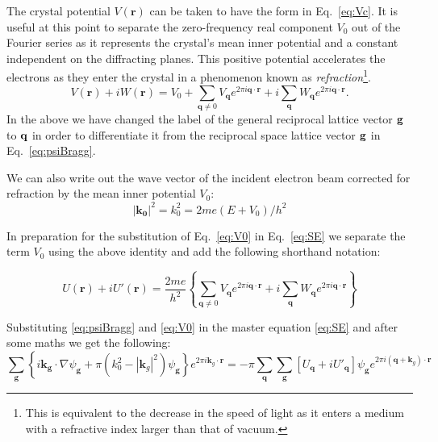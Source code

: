The crystal potential $V(\mathbf{r})$ can be taken to have the form in Eq.~\ref{eq:Vc}. It is useful at this point to separate the zero-frequency real component $V_0$ out of the Fourier series as it represents the crystal's mean inner potential and a constant independent on the diffracting planes. This positive potential accelerates the electrons as they enter the crystal in a phenomenon known as \textit{refraction}\footnote{ This is equivalent to the decrease in the speed of light as it enters a medium with a refractive index larger than that of vacuum.}.
\begin{equation}
\label{eq:V0}
V(\mathbf{r}) + i W(\mathbf{r}) = V_0 + \sum_{\mathbf{q}\neq 0} V_{\mathbf{q}} e^{2 \pi i \mathbf{q} \cdot \mathbf{r}} + i \sum_\mathbf{q} W_{\mathbf{q}} e^{2 \pi i \mathbf{q} \cdot \mathbf{r}}.
\end{equation}
In the above we have changed the label of the general reciprocal lattice vector $\vb{g}$ to $\vb{q}$ in order to differentiate it from the reciprocal space lattice vector $\vb{g}$ in Eq.~\ref{eq:psiBragg}.


We can also  write out the wave vector of the incident electron beam corrected for refraction by the mean inner potential $V_0$:
\begin{equation*}
 |\mathbf{k_0}|^2 = k_0^2  = 2me(E+V_0)/h^2
\end{equation*}

In preparation for the substitution of Eq.~\ref{eq:V0} in Eq.~\ref{eq:SE} we separate the term $V_0$ using the above identity and add the following shorthand notation:

\begin{equation*}
U(\mathbf{r}) + iU'(\mathbf{r}) = \frac{2me}{h^2}\left\{ \sum_{\mathbf{q}\neq 0} V_{\mathbf{q}} e^{2 \pi i \mathbf{q} \cdot \mathbf{r}} + i \sum_{\mathbf{q}} W_{\mathbf{q}} e^{2 \pi i \mathbf{q} \cdot \mathbf{r}}\right\}
\end{equation*}



Substituting \ref{eq:psiBragg} and \ref{eq:V0} in the master equation \ref{eq:SE} and after some maths we get the following:
\begin{equation*}
\label{eq:almost}
\sum_\mathbf{g}\left\{ i \mathbf{k_g} \cdot \nabla \psi_\mathbf{g}  + \pi \left(k_0^2 - |\mathbf{k}_g|^2\right) \psi_\mathbf{g} \right\} e^{2\pi i\mathbf{k}_g \cdot \mathbf{r}} =
-\pi \sum_\mathbf{q}\sum_\mathbf{g} [U_\mathbf{q} + iU'_\mathbf{q}]\psi_\mathbf{g} e^{2\pi i(\mathbf{q}+\mathbf{k}_g)\cdot \mathbf{r}} 
\end{equation*}

